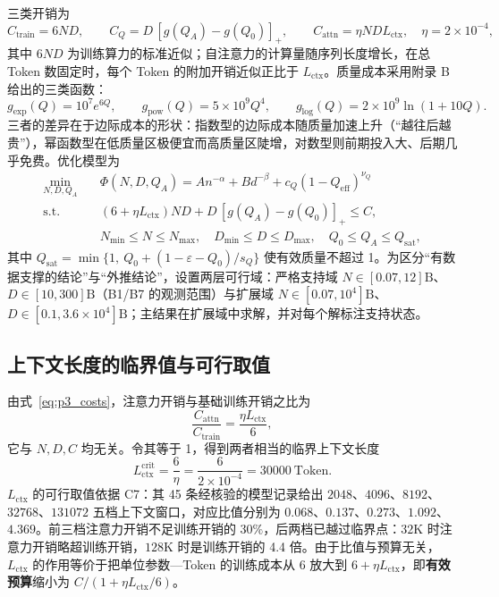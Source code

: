 三类开销为
\begin{equation}
C_{\mathrm{train}}=6ND,\qquad
C_Q=D\,[g(Q_A)-g(Q_0)]_+,\qquad
C_{\mathrm{attn}}=\eta NDL_{\mathrm{ctx}},\quad \eta=2\times10^{-4},
\label{eq:p3_costs}
\end{equation}
其中 $6ND$ 为训练算力的标准近似\cite{kaplan2020scaling,hoffmann2022compute}；自注意力的计算量随序列长度增长\cite{vaswani2017attention,dao2022flashattention}，在总 Token 数固定时，每个 Token 的附加开销近似正比于 $L_{\mathrm{ctx}}$。质量成本采用附录 B 给出的三类函数：
\begin{equation}
g_{\exp}(Q)=10^{7}e^{6Q},\qquad
g_{\mathrm{pow}}(Q)=5\times10^{9}Q^{4},\qquad
g_{\log}(Q)=2\times10^{9}\ln(1+10Q).
\label{eq:p3_g}
\end{equation}
三者的差异在于边际成本的形状：指数型的边际成本随质量加速上升（“越往后越贵”），幂函数型在低质量区极便宜而高质量区陡增，对数型则前期投入大、后期几乎免费。优化模型为
\begin{equation}
\begin{aligned}
\min_{N,D,Q_A}\quad & \Phi(N,D,Q_A)=A n^{-\alpha}+Bd^{-\beta}+c_Q(1-Q_{\mathrm{eff}})^{\nu_Q}\\
\text{s.t.}\quad & (6+\eta L_{\mathrm{ctx}})ND+D\,[g(Q_A)-g(Q_0)]_+\le C,\\
& N_{\min}\le N\le N_{\max},\quad D_{\min}\le D\le D_{\max},\quad Q_0\le Q_A\le Q_{\mathrm{sat}},
\end{aligned}
\label{eq:p3_model}
\end{equation}
其中 $Q_{\mathrm{sat}}=\min\{1,\ Q_0+(1-\varepsilon-Q_0)/s_Q\}$ 使有效质量不超过 1。为区分“有数据支撑的结论”与“外推结论”，设置两层可行域：严格支持域 $N\in[0.07,12]\mathrm{B}$、$D\in[10,300]\mathrm{B}$（B1/B7 的观测范围）与扩展域 $N\in[0.07,10^4]\mathrm{B}$、$D\in[0.1,3.6\times10^4]\mathrm{B}$；主结果在扩展域中求解，并对每个解标注支持状态。

\subsection{上下文长度的临界值与可行取值}

由式~\eqref{eq:p3_costs}，注意力开销与基础训练开销之比为
\begin{equation}
\frac{C_{\mathrm{attn}}}{C_{\mathrm{train}}}=\frac{\eta L_{\mathrm{ctx}}}{6},
\label{eq:p3_ratio}
\end{equation}
它与 $N,D,C$ 均无关。令其等于 1，得到两者相当的临界上下文长度
\begin{equation}
L_{\mathrm{ctx}}^{\mathrm{crit}}=\frac{6}{\eta}=\frac{6}{2\times10^{-4}}=30000\ \text{Token}.
\label{eq:p3_Lcrit}
\end{equation}
$L_{\mathrm{ctx}}$ 的可行取值依据 C7：其 45 条经核验的模型记录给出 $2048$、$4096$、$8192$、$32768$、$131072$ 五档上下文窗口，对应比值分别为 $0.068$、$0.137$、$0.273$、$1.092$、$4.369$。前三档注意力开销不足训练开销的 $30\%$，后两档已越过临界点：$32\mathrm{K}$ 时注意力开销略超训练开销，$128\mathrm{K}$ 时是训练开销的 4.4 倍。由于比值与预算无关，$L_{\mathrm{ctx}}$ 的作用等价于把单位参数—Token 的训练成本从 $6$ 放大到 $6+\eta L_{\mathrm{ctx}}$，即\textbf{有效预算}缩小为 $C/(1+\eta L_{\mathrm{ctx}}/6)$。

